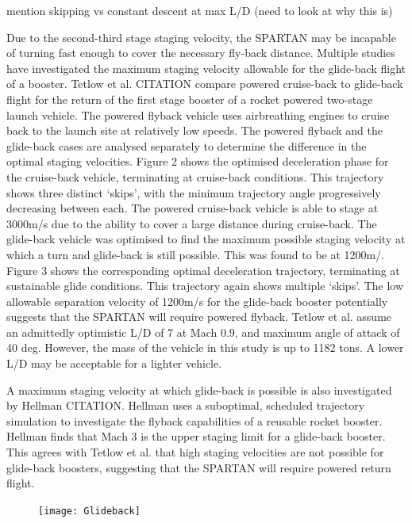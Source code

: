 mention skipping vs constant descent at max L/D (need to look at why this is)


Due to the second-third stage staging velocity, the SPARTAN may be incapable of turning fast enough to cover the necessary fly-back distance. Multiple studies have investigated the maximum staging velocity allowable for the glide-back flight of a booster. 
Tetlow et al. CITATION compare powered cruise-back to glide-back flight for the return of the first stage booster of a rocket powered two-stage launch vehicle. The powered flyback vehicle uses airbreathing engines to cruise back to the launch site at relatively low speeds. The powered flyback and the glide-back cases are analysed separately to determine the difference in the optimal staging velocities. Figure 2 shows the optimised deceleration phase for the cruise-back vehicle, terminating at cruise-back conditions. This trajectory shows three distinct ‘skips’, with the minimum trajectory angle progressively decreasing between each. The powered cruise-back vehicle is able to stage at 3000m/s due to the ability to cover a large distance during cruise-back. 
The glide-back vehicle was optimised to find the maximum possible staging velocity at which a turn and glide-back is still possible. This was found to be at 1200m/. Figure 3 shows the corresponding optimal deceleration trajectory, terminating at sustainable glide conditions. This trajectory again shows multiple ‘skips’. The low allowable separation velocity of 1200m/s for the glide-back booster potentially suggests that the SPARTAN will require powered flyback. 
Tetlow et al. assume an admittedly optimistic L/D of 7 at Mach 0.9, and maximum angle of attack of 40 deg. However, the mass of the vehicle in this study is up to 1182 tons. A lower L/D may be acceptable for a lighter vehicle.  

A maximum staging velocity at which glide-back is possible is also investigated by Hellman CITATION. Hellman uses a suboptimal, scheduled trajectory simulation to investigate the flyback capabilities of a reusable rocket booster. Hellman finds that Mach 3 is the upper staging limit for a glide-back booster. This agrees with Tetlow et al. that high staging velocities are not possible for glide-back boosters, suggesting that the SPARTAN will require powered return flight.

\begin{figure}
\centering
\texttt{[image: Glideback]}
\caption{}
\label{fig:Glideback}
\end{figure}

